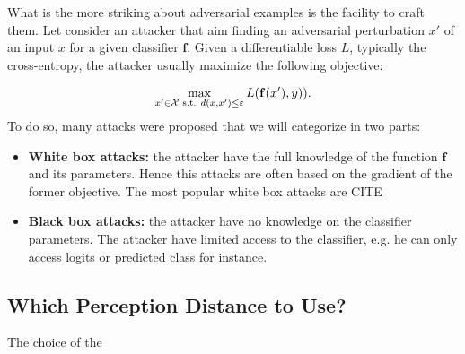 What is the more striking about adversarial examples is the facility to craft them. Let consider an attacker that aim  finding an adversarial perturbation $x'$ of an input $x$ for a given classifier $\mathbf{f}$.  Given a differentiable loss $L$, typically the cross-entropy, the attacker usually maximize the following objective:

\begin{align}
    \max_{x'\in\XX\text{ s.t. } d(x,x')\leq \varepsilon}L\left(\mathbf{f}(x'), y)\right).
\end{align}
To do so, many attacks were proposed that we will categorize in two parts: 
\begin{itemize}
    \item \textbf{White box attacks:} the attacker have the full knowledge of the function $\mathbf{f}$ and its parameters. Hence this attacks are often based on the gradient of the former objective. The most popular white box attacks are CITE
    \item \textbf{Black box attacks:} the attacker have no knowledge on the classifier parameters. The attacker have limited access to the classifier, e.g. he can only access logits or predicted class for instance.
    
\end{itemize}

\subsection{Which Perception Distance to Use?}

The choice of the 

